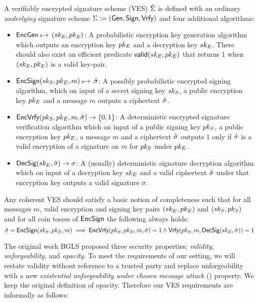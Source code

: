 \begin{definition}
\label{VES}
 A verifiably encrypted signature scheme (VES) $\hat{\Sigma}$ is defined with an ordinary \emph{underlying} signature scheme $\Sigma := (\textsf{Gen}, \textsf{Sign}, \textsf{Vrfy})$ and four additional algorithms:
    \begin{itemize}
        \item $\textsf{EncGen} \hskip2.3pt{\mbox{\tiny${\$}$\normalsize}}\!\!\rightarrow\, (sk_E, pk_E)$: A probabilistic encryption key generation algorithm which outputs an encryption key $pk_E$ and a decryption key $sk_E$. There should also exist an efficient predicate $\textsf{valid}(sk_E, pk_E)$ that returns 1 when $(sk_E, pk_E)$ is a valid key-pair.
        \item $\textsf{EncSign}(sk_S, pk_E, m) \hskip2.3pt{\mbox{\tiny${\$}$\normalsize}}\!\!\rightarrow\, \hat{\sigma}$: A possibly probabilistic encrypted signing algorithm, which on input of a secret signing key $sk_S$, a public encryption key $pk_E$ and a message $m$ outputs a ciphertext $\hat{\sigma}$.
        \item $\textsf{EncVrfy}(pk_S, pk_E, m, \hat{\sigma}) \rightarrow \{0,1\}$: A deterministic encrypted signature verification algorithm which on input of a public signing key $pk_S$, a public encryption key $pk_E$, a message $m$ and a ciphertext $\hat{\sigma}$ outputs 1 only if $\hat{\sigma}$ is a valid encryption of a signature on $m$ for $pk_S$ under $pk_E$.
        \item $\textsf{DecSig}(sk_E, \hat{\sigma}) \rightarrow \sigma$: A (usually) deterministic signature decryption algorithm which on input of a decryption key $sk_E$ and a valid ciphertext $\hat{\sigma}$ under that encryption key  outputs a valid signature $\sigma$.
    \end{itemize}

Any coherent VES should satisfy a basic notion of completeness such that for all messages $m$, valid encryption and signing key pairs $(sk_E, pk_E)$ and $(sk_S,pk_S)$ and for all coin tosses of $\textsf{EncSign}$ the following always holds:
    \[ \hat{\sigma} = \textsf{EncSign}(sk_S, pk_E, m) \implies \textsf{EncVrfy}(pk_S, pk_E, m, \hat{\sigma}) = 1 \land \textsf{Vrfy}(pk_S, m, \textsf{DecSig}(sk_E, \hat{\sigma})) = 1 \]
\end{definition}

The original work BGLS proposed three security properties: \emph{validity}, \emph{unforgeability}, and \emph{opacity}. To meet the requirements of our setting, we will restate validity without reference to a trusted party and replace unforgeability with a new \emph{existential unforgeability under chosen message attack} (\EUFCMAVES) property. We keep the original definition of opacity. Therefore our VES requirements are informally as follows:

